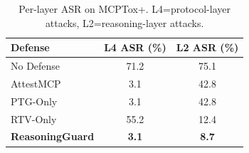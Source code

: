 \begin{table}[t]
\centering\small
\begin{tabular}{lcc}
\toprule
\textbf{Defense} & \textbf{L4 ASR (\%)} & \textbf{L2 ASR (\%)} \\
\midrule
{No Defense} & {71.2} & {75.1} \\
{AttestMCP} & {3.1} & {42.8} \\
{PTG-Only} & {3.1} & {42.8} \\
{RTV-Only} & {55.2} & {12.4} \\
\textbf{ReasoningGuard} & \textbf{3.1} & \textbf{8.7} \\
\bottomrule
\end{tabular}
\caption{Per-layer ASR on MCPTox+. L4=protocol-layer attacks, L2=reasoning-layer attacks.}
\label{tab:per_layer}
\end{table}